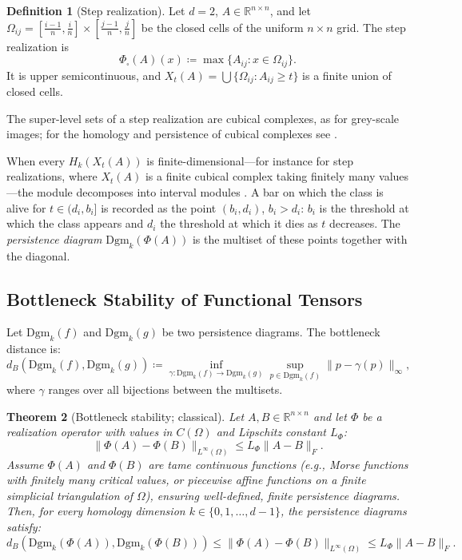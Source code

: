 \documentclass[11pt,a4paper,reqno]{amsart}
\newtheorem{theorem}{Theorem}[section]
\theoremstyle{definition}
\newtheorem{definition}[theorem]{Definition}
\numberwithin{equation}{section}
\newcommand{\R}{\mathbb{R}}
\begin{document}
\begin{definition}[Step realization]
\label{def:step}
Let $d = 2$, $A \in \R^{n \times n}$, and let $\Omega_{ij} = [\frac{i-1}{n}, \frac{i}{n}] \times [\frac{j-1}{n}, \frac{j}{n}]$ be the closed cells of the uniform $n \times n$ grid. The step realization is
\begin{equation}
    \Phi_\square(A)(x) \coloneqq \max\{ A_{ij} : x \in \Omega_{ij} \}.
\end{equation}
It is upper semicontinuous, and $X_t(A) = \bigcup\{\Omega_{ij} : A_{ij} \ge t\}$ is a finite union of closed cells.
\end{definition}
The super-level sets of a step realization are cubical complexes, as for grey-scale images; for the homology and persistence of cubical complexes see \cite{kaczynski2004computational,wagner2012efficient}.

When every $H_k(X_t(A))$ is finite-dimensional---for instance for step realizations, where $X_t(A)$ is a finite cubical complex taking finitely many values---the module decomposes into interval modules \cite{crawley2015decomposition}. A bar on which the class is alive for $t \in (d_i, b_i]$ is recorded as the point $(b_i, d_i)$, $b_i > d_i$: $b_i$ is the threshold at which the class appears and $d_i$ the threshold at which it dies as $t$ decreases. The \emph{persistence diagram} $\mathrm{Dgm}_k(\Phi(A))$ is the multiset of these points together with the diagonal.

\subsection{Bottleneck Stability of Functional Tensors}
Let $\mathrm{Dgm}_k(f)$ and $\mathrm{Dgm}_k(g)$ be two persistence diagrams. The bottleneck distance is:
\begin{equation}
    d_B(\mathrm{Dgm}_k(f), \mathrm{Dgm}_k(g)) \coloneqq \inf_{\gamma \colon \mathrm{Dgm}_k(f) \to \mathrm{Dgm}_k(g)} \sup_{p \in \mathrm{Dgm}_k(f)} \|p - \gamma(p)\|_\infty,
\end{equation}
where $\gamma$ ranges over all bijections between the multisets.

\begin{theorem}[Bottleneck stability; classical]
\label{thm:bottleneck_stability}
Let $A, B \in \R^{n \times n}$ and let $\Phi$ be a realization operator with values in $C(\Omega)$ and Lipschitz constant $L_\Phi$:
\begin{equation}
    \|\Phi(A) - \Phi(B)\|_{L^\infty(\Omega)} \le L_\Phi \|A - B\|_F.
\end{equation}
Assume $\Phi(A)$ and $\Phi(B)$ are tame continuous functions (e.g., Morse functions with finitely many critical values, or piecewise affine functions on a finite simplicial triangulation of $\Omega$), ensuring well-defined, finite persistence diagrams. Then, for every homology dimension $k \in \{0, 1, \dots, d-1\}$, the persistence diagrams satisfy:
\begin{equation}
    d_B(\mathrm{Dgm}_k(\Phi(A)), \mathrm{Dgm}_k(\Phi(B))) \le \|\Phi(A) - \Phi(B)\|_{L^\infty(\Omega)} \le L_\Phi \|A - B\|_F.
\end{equation}
\end{theorem}
\end{document}
